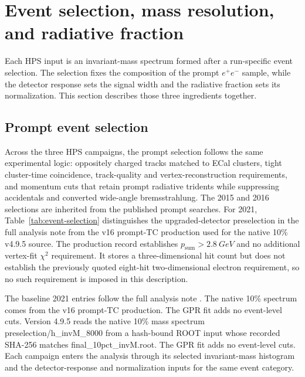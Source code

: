\section{Event selection, mass resolution, and radiative fraction}
\label{sec:event-selection}

Each HPS input is an invariant-mass spectrum formed after a run-specific event
selection. The selection fixes the composition of the prompt $e^+e^-$ sample, while
the detector response sets the signal width and the radiative fraction sets its
normalization. This section describes those three ingredients together.

\subsection{Prompt event selection}

Across the three HPS campaigns, the prompt selection follows the same experimental
logic:
oppositely charged tracks matched to ECal clusters, tight cluster-time coincidence,
track-quality and vertex-reconstruction requirements, and momentum cuts that retain
prompt radiative tridents while suppressing accidentals and converted wide-angle
bremsstrahlung. The 2015 and 2016 selections are inherited from the published prompt
searches. For 2021, Table~\ref{tab:event-selection} distinguishes the upgraded-detector
preselection in the full analysis note from the v16 prompt-TC production used for the
native 10\% v4.9.5 source. The production record establishes
$p_{\mathrm{sum}}>\SI{2.8}{GeV}$ and no additional vertex-fit $\chi^2$ requirement.
It stores a three-dimensional hit count but does not establish the previously quoted
eight-hit two-dimensional electron requirement, so no such requirement is imposed in
this description.





The baseline 2021 entries follow the full analysis note
\cite[Sec.~4.8, Table~38 and App.~A]{HPS2021FullAnalysisNote}.
\ifwritingsample
The native 10\% spectrum comes from the v16 prompt-TC production. The GPR fit adds no
event-level cuts.
\else
Version 4.9.5 reads the native 10\% mass spectrum preselection/h\_invM\_8000 from a
hash-bound ROOT input whose recorded SHA-256 matches final\_10pct\_invM.root. The GPR
fit adds no event-level cuts.
\fi
Each campaign enters the analysis through its selected invariant-mass histogram and
the detector-response and normalization inputs for the same event category.

